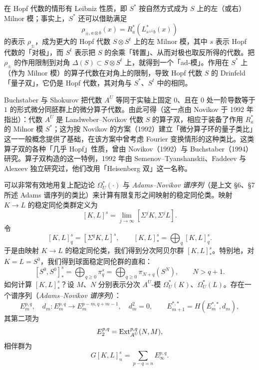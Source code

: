 在 Hopf 代数的情形有 Leibniz 性质，即 $S^*$ 按自然方式成为 $S$ 上的左（或右）Milnor 模；事实上，$S^*$ 还可以借助满足
\[
\rho_{\pm,a\otimes b}(x)=R_a^*(L_{s^{\pm1}b}^*(x))
\]
的表示 $\rho_\pm$，成为更大的 Hopf 代数 $S\otimes S^t$ 上的左 Milnor 模，其中 $s$ 表示 Hopf 代数的「对极」，而 $S^t$ 表示把 $S$ 的余乘「转置」、从而对极也取反所得的代数。把 $\rho_\pm$ 的作用限制到对角 $\Delta(S)\subset S\otimes S^t$ 上，就得到一个「ad-模」。作用在 $S^*$ 上（作为 Milnor 模）的算子代数在对角上的限制，导致 Hopf 代数 $S$ 的 Drinfeld「量子双」，它仍是 Hopf 代数，其对角与 $S^*$、$S^t$ 中的相同。

Buchstaber 与 Shokurov 把代数 $A^U$ 等同于实轴上固定 $0$、且在 $0$ 处一阶导数等于 $1$ 的形式微分同胚群上的微分算子代数。由此可得（这一点由 Novikov 于 1992 年指出）：代数 $A^U$ 是 Landweber--Novikov 代数 $S$ 的算子双，相应于装备了作用 $R_a^*$ 的 Milnor 模 $S^*$；这为按 Novikov 的方案（1992）建立「微分算子环的量子类比」这一一般概念提供了基础，在该方案中曾考虑 Fourier 变换情形的这种类比。这类算子双的各种「几乎 Hopf」性质，曾由 Novikov（1992）与 Buchstaber（1994）研究。算子双构造的这一特例，1992 年由 Semenov--Tyanshanskii、Faddeev 与 Alexeev 独立研究过，他们改用「Heisenberg 双」这一名称。

可以非常有效地用复上配边论 $\Omega_U^*(\cdot)$ 与 \emph{Adams--Novikov 谱序列}（是上文 §6、§7 所述 Adams 谱序列的类比）来计算有限复形之间映射的稳定同伦类。映射 $K\to L$ 的稳定同伦类群定义为
\[
[K,L]^s=\lim_{j\to\infty}[\Sigma^jK,\Sigma^jL].
\]
令
\[
[K,L]^s_q=[\Sigma^qK,L]^s,\qquad [K,L]^s_*=\bigoplus_q[K,L]^s_q.
\]
于是由映射 $K\to L$ 的稳定同伦类，我们得到分次阿贝尔群 $[K,L]^s_*$。特别地，对 $K=L=S^0$，我们得到球面稳定同伦群的直和：
\[
[S^0,S^0]^s_*=\bigoplus_{q\ge0}\pi_q^s=\bigoplus_{q\ge0}\pi_{N+q}(S^N),\qquad N>q+1.
\]
如何计算 $[K,L]^s_*$？设 $M$、$N$ 分别表示分次 $A^U$-模 $\Omega_U^*(K)$、$\Omega_U^*(L)$。存在一个谱序列（\emph{Adams--Novikov 谱序列}）：
\begin{equation}
E_m^{p,q},\quad d_m:E_m^{p,q}\to E_m^{p-m,q+m-1},\quad d_m^2=0,\qquad E_{m+1}^{*,*}=H(E_m^{*,*},d_m), \tag{9.9}
\end{equation}
其第二项为
\[
E_2^{p,q}=\operatorname{Ext}_{A^U}^{p,q}(N,M),
\]
相伴群为
\[
G[K,L]_n^s=\sum_{p-q=n}E_\infty^{p,q}.
\]

